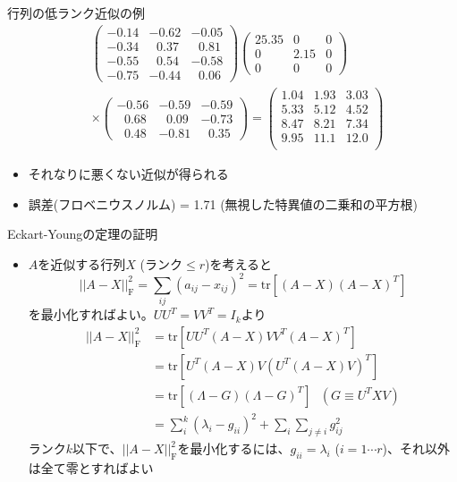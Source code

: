 \begin{frame}[t,fragile]{行列の低ランク近似の例}
  \[
  \begin{split}
    &\begin{pmatrix}
      -0.14 & -0.62 & -0.05 \\
      -0.34 & \ \ \,0.37 & \ \ \,0.81 \\
      -0.55 & \ \ \,0.54 & -0.58 \\
      -0.75 & -0.44 & \ \ \,0.06      
    \end{pmatrix}
    \begin{pmatrix}
      25.35 & 0 & 0 \\
      0 & 2.15 & 0 \\
      0 & 0 & 0
    \end{pmatrix} \\
    & \times
    \begin{pmatrix}
      -0.56 & -0.59 & -0.59 \\
      \ \ \,0.68 & \ \ \,0.09 & -0.73 \\
      \ \ \,0.48 & -0.81 & \ \ \,0.35
    \end{pmatrix}
    = 
    \begin{pmatrix}
      1.04 & 1.93 & 3.03 \\
      5.33 & 5.12 & 4.52 \\
      8.47 & 8.21 & 7.34 \\
      9.95 & 11.1 & 12.0 \\
    \end{pmatrix}
  \end{split}
  \]
  \begin{itemize}
  \item それなりに悪くない近似が得られる
  \item 誤差(フロベニウスノルム) = 1.71 (無視した特異値の二乗和の平方根)
  \end{itemize}
\end{frame}

\begin{frame}[t,fragile]{Eckart-Youngの定理の証明}
  \begin{itemize}
    \setlength{\itemsep}{1em}
  \item $A$を近似する行列$X$ (ランク$\le r$)を考えると
    \[
    ||A-X||_\mathrm{F}^2 = \sum_{ij}(a_{ij}-x_{ij})^2 = \text{tr} [(A-X)(A-X)^T]
    \]
    を最小化すればよい。$UU^T=VV^T = I_k$より
    \[
    \begin{split}
      ||A-X||_\mathrm{F}^2 &= \text{tr} [UU^T(A-X)VV^T(A-X)^T] \\
      &= \text{tr} [U^T(A-X)V (U^T(A-X)V)^T] \\
      &= \text{tr} [(\Lambda-G)(\Lambda-G)^T]  \ \ \ (G \equiv U^TXV)\\
      &= \sum_i^k (\lambda_i - g_{ii})^2 + \sum_i \sum_{j \ne i} g_{ij}^2
    \end{split}
    \]
    ランク$k$以下で、$||A-X||_\mathrm{F}^2$を最小化するには、$g_{ii}=\lambda_i$ ($i=1 \cdots r$)、それ以外は全て零とすればよい
  \end{itemize}
\end{frame}

